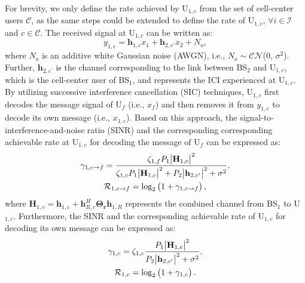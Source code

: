 \documentclass[conference]{IEEEtran}
\begin{document}
For brevity, we only define the rate achieved by U$_{1,c}$ from the set of cell-center users $\mathcal{C}$, as the same steps could be extended to define the rate of U$_{1,c}$, $\forall i \in \mathcal{I}$ and $c \in \mathcal{C}$. The received signal at U$_{1,c}$ can be written as:
\begin{equation}
    y_{1,c}=\textbf{h}_{1,c}x_1 + \textbf{h}_{2,c^\prime} x_2 + N_o,
\end{equation}
where $N_o$ is an additive white Gaussian noise (AWGN), i.e., $N_o\sim \mathcal{CN}$(0, $\sigma^2$). Further, $\textbf{h}_{2,c^\prime}$ is the channel corresponding to the link between BS$_2$ and U$_{1,c}$, which is the cell-center user of BS$_1$, and represents the ICI experienced at U$_{1,c}$. By utilizing successive interference cancellation (SIC) techniques, U$_{1,c}$ first decodes the message signal of U$_f$ (i.e., $x_f$) and then removes it from $y_{1,c}$ to decode its own message (i.e., $x_{1,c}$). Based on this approach, the signal-to-interference-and-noise ratio (SINR) and the corresponding corresponding achievable rate at U$_{1,c}$ for decoding the message of U$_f$ can be expressed as:
\begin{gather}
    \gamma_{1,c\rightarrow f}=\frac{\zeta_{1,f}P_1\abs{\textbf{H}_{1,c}}^2}{\zeta_{1,c}P_1\abs{\textbf{H}_{1,c}}^2 + P_2\abs{\textbf{h}_{2,c^\prime}}^2 +  \sigma^2}, \\
    \mathcal{R}_{1,c\rightarrow f}=\log_2\left(1+\gamma_{1,c\rightarrow f}\right),
\end{gather}
where $\textbf{H}_{1,c}=\textbf{h}_{1,c}+\textbf{h}_{R, c}^H \mathbf{\Theta_r}\textbf{h}_{1, R}$ represents the combined channel from BS$_1$ to U$_{1,c}$. Furthermore, the SINR and the corresponding achievable rate of U$_{1,c}$ for decoding its own message can be expressed as:
\begin{gather}
    \gamma_{1,c}=\zeta_{1,c}\frac{P_1\abs{\textbf{H}_{1,c}}^2}{P_2\abs{\textbf{h}_{2,c^\prime}}^2 + \sigma^2}, \\
    \mathcal{R}_{1,c} = \log_2\left(1+\gamma_{1,c}\right).
\end{gather}
\end{document}

